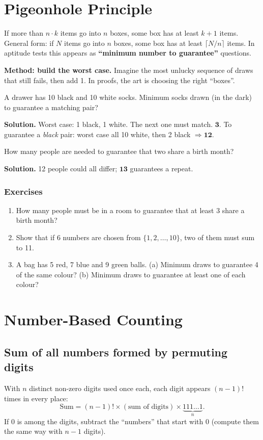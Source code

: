\documentclass[11pt,a4paper,openany]{report}
\newenvironment{exercises}{\subsection*{Exercises \thechapter}\begin{enumerate}[label=\textbf{\thechapter.\arabic*},leftmargin=3.2em]}{\end{enumerate}}
\begin{document}
\chapter{Pigeonhole Principle}\label{ch:pig}

If more than $n\cdot k$ items go into $n$ boxes, some box has at least $k+1$ items.
General form: if $N$ items go into $n$ boxes, some box has at least $\lceil N/n\rceil$ items.
In aptitude tests this appears as \textbf{``minimum number to guarantee''} questions.

\textbf{Method: build the worst case.} Imagine the most unlucky sequence of draws that still
fails, then add 1. In proofs, the art is choosing the right ``boxes''.

\begin{example}
A drawer has 10 black and 10 white socks. Minimum socks drawn (in the dark) to guarantee a matching pair?

\textbf{Solution.} Worst case: 1 black, 1 white. The next one must match. $\mathbf{3}$.
To guarantee a \emph{black} pair: worst case all 10 white, then 2 black $\Rightarrow \mathbf{12}$.
\end{example}

\begin{example}
How many people are needed to guarantee that two share a birth month?

\textbf{Solution.} 12 people could all differ; $\mathbf{13}$ guarantees a repeat.
\end{example}

\begin{exercises}
\item How many people must be in a room to guarantee that at least 3 share a birth month?
\item Show that if 6 numbers are chosen from $\{1,2,\dots,10\}$, two of them must sum to 11.
\item A bag has 5 red, 7 blue and 9 green balls. (a) Minimum draws to guarantee 4 of the same colour? (b) Minimum draws to guarantee at least one of each colour?
\end{exercises}

\chapter{Number-Based Counting}\label{ch:numcount}

\section{Sum of all numbers formed by permuting digits}
With $n$ distinct non-zero digits used once each, each digit appears $(n-1)!$ times in every place:
\[\text{Sum}=(n-1)!\times(\text{sum of digits})\times\underbrace{111\ldots1}_{n}.\]
If 0 is among the digits, subtract the ``numbers'' that start with 0 (compute them the same way with $n-1$ digits).
\end{document}
